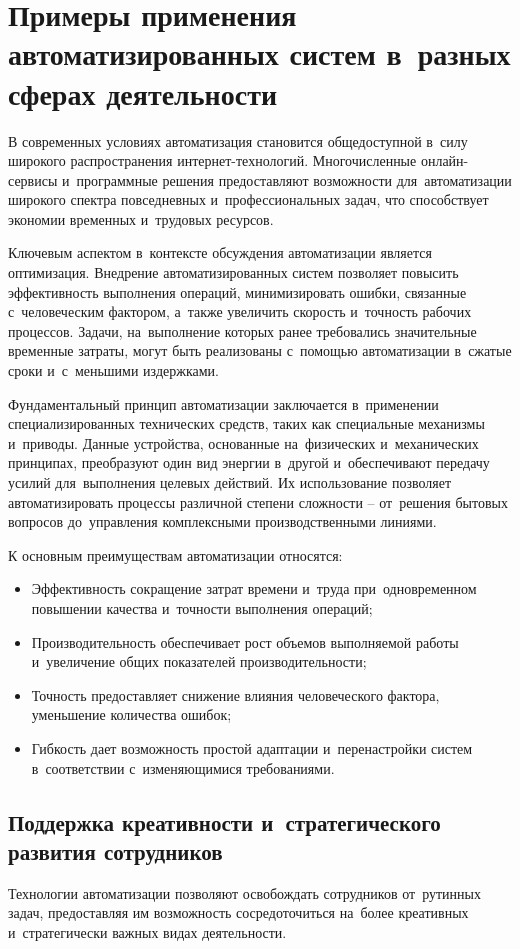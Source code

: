 \documentclass{ou}
\begin{document}
\section{Примеры применения автоматизированных систем в~разных сферах деятельности}
В современных условиях автоматизация становится общедоступной в~силу широкого распространения интернет-технологий. Многочисленные онлайн-сервисы и~программные решения предоставляют возможности для~автоматизации широкого спектра повседневных и~профессиональных задач, что способствует экономии временных и~трудовых ресурсов.

Ключевым аспектом в~контексте обсуждения автоматизации является оптимизация. Внедрение автоматизированных систем позволяет повысить эффективность выполнения операций, минимизировать ошибки, связанные с~человеческим фактором, а~также увеличить скорость и~точность рабочих процессов. Задачи, на~выполнение которых ранее требовались значительные временные затраты, могут быть реализованы с~помощью автоматизации в~сжатые сроки и~с~меньшими издержками.

Фундаментальный принцип автоматизации заключается в~применении специализированных технических средств, таких как специальные механизмы и~приводы. Данные устройства, основанные на~физических и~механических принципах, преобразуют один вид энергии в~другой и~обеспечивают передачу усилий для~выполнения целевых действий. Их использование позволяет автоматизировать процессы различной степени сложности -- от~решения бытовых вопросов до~управления комплексными производственными линиями.

К основным преимуществам автоматизации относятся:
\begin{itemize}[label=-, leftmargin=0em, itemindent=3.35em, nosep]
\item Эффективность сокращение затрат времени и~труда при~одновременном повышении качества и~точности выполнения операций;
\item Производительность обеспечивает рост объемов выполняемой работы и~увеличение общих показателей производительности;
\item Точность предоставляет снижение влияния человеческого фактора, уменьшение количества ошибок;
\item Гибкость дает возможность простой адаптации и~перенастройки систем в~соответствии с~изменяющимися требованиями.
\end{itemize}
\subsection{Поддержка креативности и~стратегического развития сотрудников}
Технологии автоматизации позволяют освобождать сотрудников от~рутинных задач, предоставляя им возможность сосредоточиться на~более креативных и~стратегически важных видах деятельности.
\end{document}
